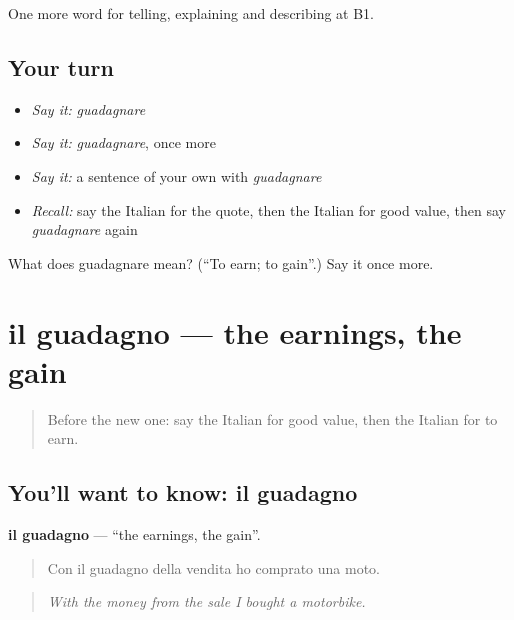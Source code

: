 \begin{grammarlens}[title={What you've built}]
One more word for telling, explaining and describing at B1.
\end{grammarlens}

\subsection*{Your turn}
\begin{itemize}
\raggedright
  \item \emph{Say it:} \emph{guadagnare}
  \item \emph{Say it:} \emph{guadagnare}, once more
  \item \emph{Say it:} a sentence of your own with \emph{guadagnare}
  \item \emph{Recall:} say the Italian for the quote, then the Italian for good value, then say \emph{guadagnare} again
\end{itemize}

\begin{tcolorbox}[breakable,colback=teal!4,colframe=teal!35!black,title={Before you move on}]
What does guadagnare mean? (\textquotedblleft{}To earn; to gain\textquotedblright{}.) Say it once more.
\end{tcolorbox}
\section[il guadagno]{il guadagno — the earnings, the gain}

\label{lesson:IT-C398-guadagno}



\begin{quote}
Before the new one: say the Italian for good value, then the Italian for to earn.
\end{quote}

\subsection*{You'll want to know: il guadagno}
\textbf{il guadagno} — \textquotedblleft{}the earnings, the gain\textquotedblright{}.

\begin{quote}
Con il guadagno della vendita ho comprato una moto.
\end{quote}

\begin{quote}
\emph{With the money from the sale I bought a motorbike.}
\end{quote}

